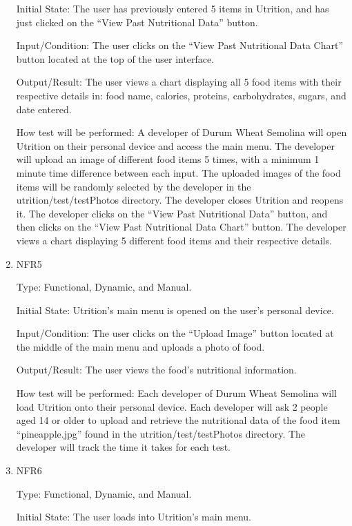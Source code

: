 \documentclass[12pt, titlepage]{article}
\begin{document}
\begin{enumerate}
		Initial State: The user has previously entered 5 items in Utrition, and has just clicked on the “View Past Nutritional Data” button.
		
		Input/Condition: The user clicks on the “View Past Nutritional Data Chart” button located at the top of the user interface.
		
		Output/Result: The user views a chart displaying all 5 food items with their respective details in: food name, calories, proteins, carbohydrates, sugars, and date entered.
		
		How test will be performed: A developer of Durum Wheat Semolina will open Utrition on their personal device and access the main menu. The developer will upload an image of different food items 5 times, with a minimum 1 minute time difference between each input. The uploaded images of the food items will be randomly selected by the developer in the utrition/test/testPhotos directory. The developer closes Utrition and reopens it. The developer clicks on the “View Past Nutritional Data” button, and then clicks on the “View Past Nutritional Data Chart” button. The developer views a chart displaying 5 different food items and their respective details.
		
		\item{NFR5\\}
		
		Type: Functional, Dynamic, and Manual.
		
		Initial State: Utrition’s main menu is opened on the user’s personal device.
		
		Input/Condition: The user clicks on the “Upload Image” button located at the middle of the main menu and uploads a photo of food.
		
		Output/Result: The user views the food’s nutritional information.
		
		How test will be performed: Each developer of Durum Wheat Semolina will load Utrition onto their personal device. Each developer will ask 2 people aged 14 or older to upload and retrieve the nutritional data of the food item “pineapple.jpg” found in the utrition/test/testPhotos directory. The developer will track the time it takes for each test.
		
		\item{NFR6\\}
		
		Type: Functional, Dynamic, and Manual.
		
		Initial State: The user loads into Utrition’s main menu.
		

\end{enumerate}
\end{document}
